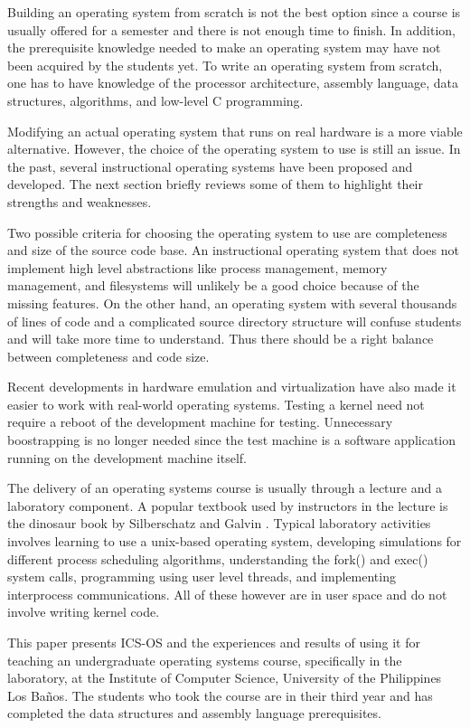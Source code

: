 \documentclass{acm_proc_article-sp}
\begin{document}
Building an operating system from scratch is not the best option since a course
is usually offered for a semester and there is not enough time to finish. In 
addition, the prerequisite knowledge needed to make an operating system may have
not been acquired by the students yet. To write an operating system from 
scratch, one has to have knowledge of the processor architecture, assembly
language, data structures, algorithms, and low-level C programming.

Modifying an actual operating system that runs on real hardware is a more
viable alternative. However, the choice of the operating system to use is
still an issue. In the past, several instructional operating systems have been
proposed and developed. The next section briefly reviews some of them 
to highlight their strengths and weaknesses.

Two possible criteria for choosing the operating system to use are completeness 
and size of the source code base. An instructional operating system that does
not implement high level abstractions like process management, memory 
management, and filesystems will unlikely be a good choice because
of the missing features. On the other hand, an operating system with several 
thousands of lines of code and a complicated source directory structure will
confuse students and will take more time to understand. Thus there should
be a right balance between completeness and code size.

Recent developments in hardware emulation and virtualization have also made it 
easier to work with real-world operating systems. Testing a kernel need not
require a reboot of the development machine for testing. Unnecessary 
boostrapping is no longer needed since the test machine is a software
application running on the development machine itself.
 
The delivery of an operating systems course is usually through a
lecture and a laboratory component. A popular textbook used by instructors in
the lecture is the dinosaur book by Silberschatz and Galvin 
\cite{silberschatz:osc}. Typical laboratory activities involves learning to 
use a unix-based operating system, developing simulations for different process
scheduling algorithms, understanding the fork() and exec() system calls, 
programming using user level threads, and implementing interprocess
communications. All of these however are in user space and do not involve 
writing kernel code.

This paper presents ICS-OS and the experiences and results of using it for 
teaching an undergraduate operating systems course, specifically in the
laboratory, at the Institute of Computer Science, University of the Philippines
Los Ba\~nos. The students who took the course are in their third year and
has completed the data structures and assembly language prerequisites.
\end{document}
